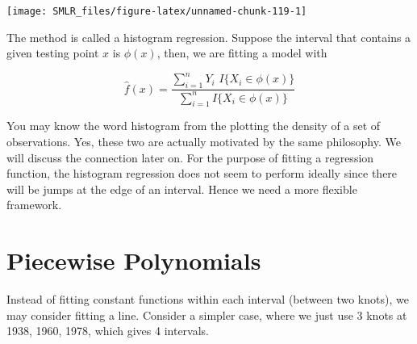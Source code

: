 \documentclass[
]{book}
\theoremstyle{definition}
\theoremstyle{definition}
\theoremstyle{definition}
\theoremstyle{definition}
\theoremstyle{remark}
\begin{document}
\begin{center}\texttt{[image: SMLR\_files/figure-latex/unnamed-chunk-119-1]} \end{center}

The method is called a histogram regression. Suppose the interval that contains a given testing point \(x\) is \(\phi(x)\), then, we are fitting a model with

\[\widehat{f}(x) = \frac{\sum_{i=1}^n Y_i \,\, I\{X_i \in \phi(x)\} }{ \sum_{i=1}^n I\{X_i \in \phi(x)\}}\]

You may know the word histogram from the plotting the density of a set of observations. Yes, these two are actually motivated by the same philosophy. We will discuss the connection later on. For the purpose of fitting a regression function, the histogram regression does not seem to perform ideally since there will be jumps at the edge of an interval. Hence we need a more flexible framework.

\hypertarget{piecewise-polynomials}{%
\section{Piecewise Polynomials}\label{piecewise-polynomials}}

Instead of fitting constant functions within each interval (between two knots), we may consider fitting a line. Consider a simpler case, where we just use 3 knots at 1938, 1960, 1978, which gives 4 intervals.
\end{document}
